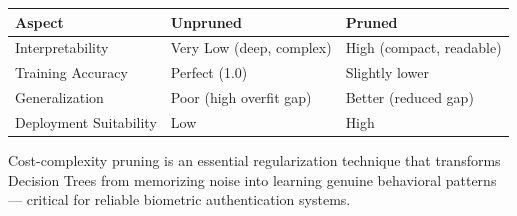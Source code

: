 \documentclass[11pt]{article}
\newcounter{none}
\begin{document}
{\def\LTcaptype{none} %
\begin{longtable}[]{@{}
  >{\raggedright\arraybackslash}p{}
  >{\raggedright\arraybackslash}p{}
  >{\raggedright\arraybackslash}p{}@{}}
\toprule\noalign{}
\begin{minipage}[b]{\linewidth}\raggedright
Aspect
\end{minipage} & \begin{minipage}[b]{\linewidth}\raggedright
Unpruned
\end{minipage} & \begin{minipage}[b]{\linewidth}\raggedright
Pruned
\end{minipage} \\
\midrule\noalign{}
\endhead
\bottomrule\noalign{}
\endlastfoot
Interpretability & Very Low (deep, complex) & High (compact,
readable) \\
Training Accuracy & Perfect (1.0) & Slightly lower \\
Generalization & Poor (high overfit gap) & Better (reduced gap) \\
Deployment Suitability & Low & High \\
\end{longtable}
}

Cost-complexity pruning is an essential regularization technique that
transforms Decision Trees from memorizing noise into learning genuine
behavioral patterns --- critical for reliable biometric authentication
systems.


    
    
    
\end{document}
